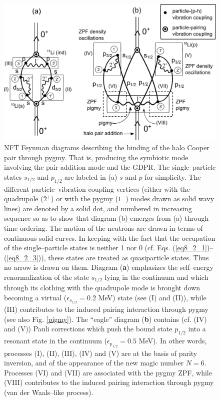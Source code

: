 \begin{subappendices}
   \begin{figure}
   \centerline{\includegraphics*[width=17cm,angle=0]{nutshell/figs/VdW.pdf}}\caption{NFT Feynman diagrams describing the binding of the halo Cooper pair through pygmy. That is, producing the symbiotic mode involving the pair addition mode and the GDPR. The single--particle states $s_{1/2}$ and $p_{1/2}$ are labeled in (a) $s$ and $p$ for simplicity. The different particle--vibration coupling vertices (either with the quadrupole ($2^+$) or with the pygmy ($1^-$) modes drawn as solid wavy lines) are denoted by a solid dot, and numbered in increasing sequence so as to show that diagram (b) emerges from (a) through time ordering. The motion of the neutrons are drawn in terms of continuous solid curves. In keeping with the fact that the occupation of the single--particle states is neither 1 nor 0 (cf. Eqs. (\ref{eq8_2_1})--(\ref{eq8_2_3})), these states are treated as quasiparticle states. Thus no arrow is drawn on them. Diagram (\textbf{a}) emphasizes the self--energy renormalization of the state $s_{1/2}$ lying in the continuum and which   through its clothing with the quadrupole mode is brought down becoming a virtual ($\epsilon_{s_{1/2}}=0.2$ MeV) state (see (I) and (II)), while (III) contributes to the induced pairing interaction through pygmy (see also Fig. \ref{pigmy}). The ``eagle'' diagram (\textbf{b}) contains (cf. (IV) and (V)) Pauli corrections which push the bound state $p_{1/2}$ into a resonant state in the continuum ($\epsilon_{p_{1/2}}=0.5$ MeV). In other words, processes (I), (II), (III), (IV) and (V) are at the basis of parity inversion, and of the appearance of the new magic number $N=6$. Processes (VI) and (VII) are associated with the pygmy ZPF, while (VIII) contributes to the induced pairing interaction through pygmy (van der Waals--like process).}\label{fig2.A.1}
   \end{figure}
 

\end{subappendices}
